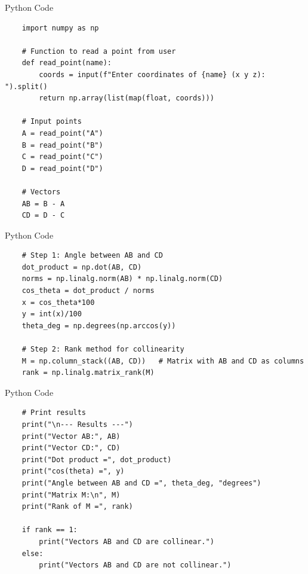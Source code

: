 \documentclass{beamer}
\begin{document}
\begin{frame}[fragile]{Python Code}
    \begin{verbatim}
    import numpy as np
    
    # Function to read a point from user
    def read_point(name):
        coords = input(f"Enter coordinates of {name} (x y z): ").split()
        return np.array(list(map(float, coords)))
    
    # Input points
    A = read_point("A")
    B = read_point("B")
    C = read_point("C")
    D = read_point("D")
    
    # Vectors
    AB = B - A
    CD = D - C
    \end{verbatim}
\end{frame}

\begin{frame}[fragile]{Python Code}
    \begin{verbatim}
    # Step 1: Angle between AB and CD
    dot_product = np.dot(AB, CD)
    norms = np.linalg.norm(AB) * np.linalg.norm(CD)
    cos_theta = dot_product / norms
    x = cos_theta*100
    y = int(x)/100
    theta_deg = np.degrees(np.arccos(y))
    
    # Step 2: Rank method for collinearity
    M = np.column_stack((AB, CD))   # Matrix with AB and CD as columns
    rank = np.linalg.matrix_rank(M)
    \end{verbatim}
\end{frame}

\begin{frame}[fragile]{Python Code}
    \begin{verbatim}
    # Print results
    print("\n--- Results ---")
    print("Vector AB:", AB)
    print("Vector CD:", CD)
    print("Dot product =", dot_product)
    print("cos(theta) =", y)
    print("Angle between AB and CD =", theta_deg, "degrees")
    print("Matrix M:\n", M)
    print("Rank of M =", rank)
    
    if rank == 1:
        print("Vectors AB and CD are collinear.")
    else:
        print("Vectors AB and CD are not collinear.")
    \end{verbatim}
\end{frame}
\end{document}
